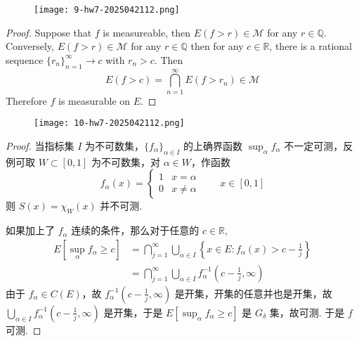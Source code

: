 \begin{exercise}
\begin{figure}[H]
\centering
\texttt{[image: 9-hw7-2025042112.png]}
\label{}
\end{figure}
\end{exercise}
\begin{proof}
Suppose that $f$ is measureable, then $E (f>r)\in \mathcal{M}$ for any $r\in \mathbb{Q}$. Conversely, $E (f>r)\in \mathcal{M}$ for any $r\in \mathbb{Q}$ then for any $c\in \mathbb{R}$, there is a rational sequence $\{ r_n \}_{n=1}^{\infty}\to c$ with $r_n>c$. Then
\[
E(f>c)=\bigcap_{n=1}^{\infty} E(f>r_n)\in \mathcal{M}
\]
Therefore $f$ is measurable on $E$.
\end{proof}

\begin{exercise}
\begin{figure}[H]
\centering
\texttt{[image: 10-hw7-2025042112.png]}
\label{}
\end{figure}
\end{exercise}
\begin{proof}
当指标集 $I$ 为不可数集，$\{ f_{\alpha} \}_{\alpha\in I}$ 的上确界函数 $\sup_{\alpha}f_{\alpha}$ 不一定可测，反例可取 $W\subset[0,1]$ 为不可数集，对 $\alpha\in W$，作函数
\[
f_{\alpha}(x)=\begin{cases}
1 & x=\alpha \\
0 & x\neq \alpha
\end{cases}\qquad x\in[0,1]
\]
则 $S(x)=\chi_{W}(x)$ 并不可测.

如果加上了 $f_{\alpha}$ 连续的条件，那么对于任意的 $c\in \mathbb{R}$,
\[
\begin{aligned}
E[\sup_{\alpha}f_{\alpha}\geq c] & =\bigcap_{j=1}^{\infty} \bigcup_{\alpha\in I}\left\{  x\in E:f_\alpha(x)> c-\frac{1}{j}  \right\} \\
 & =\bigcap_{j=1}^{\infty} \bigcup_{\alpha\in I}f_{\alpha}^{-1}\left( c-\frac{1}{j},\infty \right)
\end{aligned}
\]
由于 $f_{\alpha}\in C(E)$，故 $f^{-1}_{\alpha}\left( c-\frac{1}{j},\infty \right)$ 是开集，开集的任意并也是开集，故 $\bigcup_{\alpha\in I}f^{-1}_{\alpha}\left( c-\frac{1}{j},\infty \right)$ 是开集，于是 $E[\sup_{\alpha}f_{\alpha}\geq c]$ 是 $G_{\delta}$ 集，故可测. 于是 $f$ 可测.
\end{proof}

